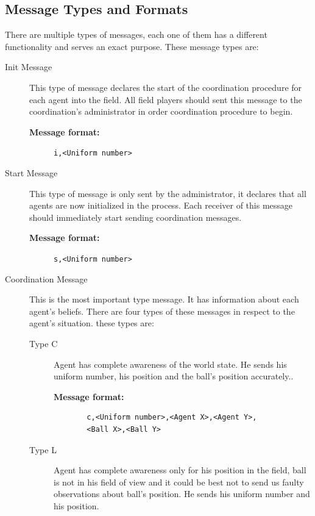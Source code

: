 \subsection{Message Types and Formats}
There are multiple types of messages, each one of them has a different functionality and serves an exact purpose. These message types are:
\begin{description}
\item[Init Message] This type of message declares the start of the coordination procedure for each agent into the field. All field players should sent this message to the coordination's administrator in order coordination procedure to begin.

\begin{description}
  \item[{\bf Message format:}] 
  \texttt{i,<Uniform number> }
\end{description}

\item[Start Message] This type of message is only sent by the administrator, it declares that all agents are now initialized in the process. Each receiver of this message should immediately start sending coordination messages.

\begin{description}
  \item[{\bf Message format:}] 
  \texttt{s,<Uniform number>}
\end{description}

\item[Coordination Message] This is the most important type message. It has information about each agent's beliefs. There are four types of these messages in respect to the agent's situation. these types are:
\begin{description}

\item[Type C] Agent has complete awareness of the world state. He sends his uniform number, his position and the ball's position accurately..

\begin{description}
  \item[{\bf Message format:}]
  \begin{verbatim}
  c,<Uniform number>,<Agent X>,<Agent Y>,
  <Ball X>,<Ball Y>\end{verbatim}
\end{description}

\item[Type L] Agent has complete awareness only for his position in the field, ball is not in his field of view and it could be best not to send us faulty observations about ball's position. He sends his uniform number and his position.


\end{description}
\end{description}
